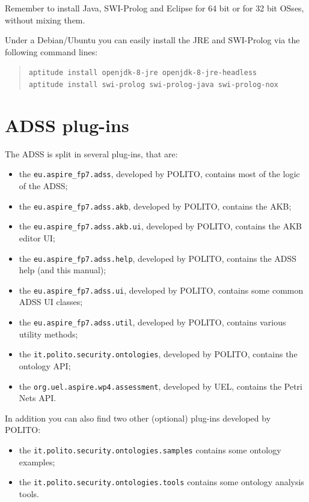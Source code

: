\documentclass{memoir}
\newcommand{\PlugIn}[1]{\texttt{#1}}
\begin{document}
	Remember to install Java, SWI-Prolog and Eclipse for 64 bit or for 32 bit OSses, without mixing them.
	
	Under a Debian/Ubuntu you can easily install the JRE and SWI-Prolog via the following command lines:
	
	\begin{quote}
		\texttt{aptitude install openjdk-8-jre openjdk-8-jre-headless}\\
		\texttt{aptitude install swi-prolog swi-prolog-java swi-prolog-nox}
	\end{quote}
	
	\chapter{ADSS plug-ins}

	The ADSS is split in several plug-ins, that are:
	
	\begin{itemize}
		\item the \PlugIn{eu.aspire\_fp7.adss}, developed by POLITO, contains most of the logic of the ADSS;
		\item the \PlugIn{eu.aspire\_fp7.adss.akb}, developed by POLITO, contains the AKB;
		\item the \PlugIn{eu.aspire\_fp7.adss.akb.ui}, developed by POLITO, contains the AKB editor UI;
		\item the \PlugIn{eu.aspire\_fp7.adss.help}, developed by POLITO, contains the ADSS help (and this manual);
		\item the \PlugIn{eu.aspire\_fp7.adss.ui}, developed by POLITO, contains some common ADSS UI classes;
		\item the \PlugIn{eu.aspire\_fp7.adss.util}, developed by POLITO, contains various utility methods;
		\item the \PlugIn{it.polito.security.ontologies}, developed by POLITO, contains the ontology API;
		\item the \PlugIn{org.uel.aspire.wp4.assessment}, developed by UEL, contains the Petri Nets API.
	\end{itemize}

	In addition you can also find two other (optional) plug-ins developed by POLITO:
	
	\begin{itemize}
		\item the \PlugIn{it.polito.security.ontologies.samples} contains some ontology examples;
		\item the \PlugIn{it.polito.security.ontologies.tools} contains some ontology analysis tools.
	\end{itemize}
	
\end{document}

